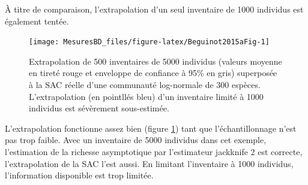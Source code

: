 \documentclass[
  11pt,
  french,
  a4paper,
  extrafontsizes,onecolumn,openright
  ]{memoir}
\newenvironment{Shaded}{\begin{snugshade}}{\end{snugshade}}
\newcommand{\CommentTok}[1]{\textcolor[rgb]{0.56,0.35,0.01}{\textit{#1}}}
\newcommand{\DataTypeTok}[1]{\textcolor[rgb]{0.13,0.29,0.53}{#1}}
\newcommand{\DecValTok}[1]{\textcolor[rgb]{0.00,0.00,0.81}{#1}}
\newcommand{\FloatTok}[1]{\textcolor[rgb]{0.00,0.00,0.81}{#1}}
\newcommand{\KeywordTok}[1]{\textcolor[rgb]{0.13,0.29,0.53}{\textbf{#1}}}
\newcommand{\NormalTok}[1]{#1}
\newcommand{\OperatorTok}[1]{\textcolor[rgb]{0.81,0.36,0.00}{\textbf{#1}}}
\newcommand{\StringTok}[1]{\textcolor[rgb]{0.31,0.60,0.02}{#1}}
\begin{document}
\begin{Shaded}
\end{Shaded}

\normalsize

À titre de comparaison, l'extrapolation d'un seul inventaire de 1000 individus est également tentée.



\scriptsize

\begin{figure}

{\centering \texttt{[image: MesuresBD\_files/figure-latex/Beguinot2015aFig-1]} 

}

\caption{Extrapolation de 500 inventaires de 5000 individus (valeurs moyenne en tireté rouge et enveloppe de confiance à 95\% en gris) superposée à la SAC réelle d'une communauté log-normale de 300 espèces. L'extrapolation (en pointllés bleu) d'un inventaire limité à 1000 individus est sévèrement sous-estimée.}\label{fig:Beguinot2015aFig}
\end{figure}

\normalsize

L'extrapolation fonctionne assez bien (figure \ref{fig:Beguinot2015aFig}) tant que l'échantillonnage n'est pas trop faible.
Avec un inventaire de 5000 individus dans cet exemple, l'estimation de la richesse asymptotique par l'estimateur jackknife 2 est correcte, l'extrapolation de la SAC l'est aussi.
En limitant l'inventaire à 1000 individus, l'information disponible est trop limitée.
\end{document}
